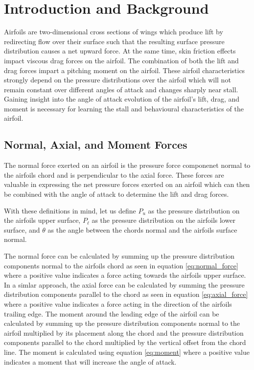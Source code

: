 \documentclass[runningheads]{llncs}
\begin{document}


\section{Introduction and Background}\label{sec:introduction_and_background}

Airfoils are two-dimensional cross sections of wings which produce lift by redirecting flow over their surface such that the resulting surface pressure distribution causes a net upward force. At the same time, skin friction effects impact viscous drag forces on the airfoil. The combination of both the lift and drag forces impart a pitching moment on the airfoil. These airfoil characteristics strongly depend on the pressure distributions over the airfoil which will not remain constant over different angles of attack and changes sharply near stall. Gaining insight into the angle of attack evolution of the airfoil's lift, drag, and moment is necessary for learning the stall and behavioural characteristics of the airfoil.

\subsection{Normal, Axial, and Moment Forces}

The normal force exerted on an airfoil is the pressure force componenet normal to the airfoils chord and is perpendicular to the axial force. These forces are valuable in expressing the net pressure forces exerted on an airfoil which can then be combined with the angle of attack to determine the lift and drag forces.

With these definitions in mind, let us define $P_u$ as the pressure distribution on the airfoils upper surface, $P_\ell$ as the pressure distribution on the airfoils lower surface, and $\theta$ as the angle between the chords normal and the airfoils surface normal.

The normal force can be calculated by summing up the pressure distribution components normal to the airfoils chord as seen in equation \ref{eq:normal_force} where a positive value indicates a force acting towards the airfoils upper surface. In a simlar approach, the axial force can be calculated by summing the pressure distribution components parallel to the chord as seen in equation \ref{eq:axial_force} where a positive value indicates a force acting in the direction of the airfoils trailing edge. The moment around the leading edge of the airfoil can be calculated by summing up the pressure distribution components normal to the airfoil multiplied by its placement along the chord and the pressure distribution components parallel to the chord multiplied by the vertical offset from the chord line. The moment is calculated using equation \ref{eq:moment} where a positive value indicates a moment that will increase the angle of attack.
\end{document}
